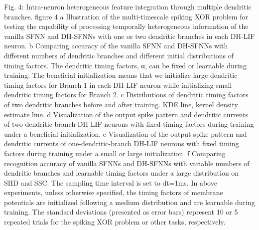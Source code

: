 Fig. 4: Intra-neuron heterogeneous feature integration through multiple dendritic branches.
figure 4
a Illustration of the multi-timescale spiking XOR problem for testing the capability of processing temporally heterogeneous information of the vanilla SFNN and DH-SFNNs with one or two dendritic branches in each DH-LIF neuron. b Comparing accuracy of the vanilla SFNN and DH-SFNNs with different numbers of dendritic branches and different initial distributions of timing factors. The dendritic timing factors, α, can be fixed or learnable during training. The beneficial initialization means that we initialize large dendritic timing factors for Branch 1 in each DH-LIF neuron while initializing small dendritic timing factors for Branch 2. c Distributions of dendritic timing factors of two dendritic branches before and after training. KDE line, kernel density estimate line. d Visualization of the output spike pattern and dendritic currents of two-dendritic-branch DH-LIF neurons with fixed timing factors during training under a beneficial initialization. e Visualization of the output spike pattern and dendritic currents of one-dendritic-branch DH-LIF neurons with fixed timing factors during training under a small or large initialization. f Comparing recognition accuracy of vanilla SFNNs and DH-SFNNs with variable numbers of dendritic branches and learnable timing factors under a large distribution on SHD and SSC. The sampling time interval is set to dt=1ms. In above experiments, unless otherwise specified, the timing factors of membrane potentials are initialized following a medium distribution and are learnable during training. The standard deviations (presented as error bars) represent 10 or 5 repeated trials for the spiking XOR problem or other tasks, respectively.

